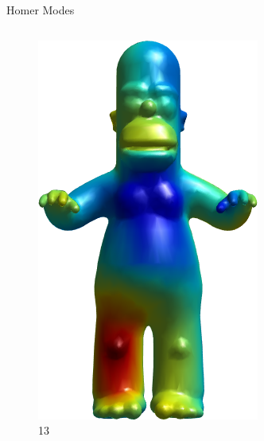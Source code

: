 \documentclass{beamer}
\begin{document}
\begin{frame}{Homer Modes}
\begin{columns}
\begin{column}[T]{3cm}
\begin{figure}[t]
    \includegraphics[width=\textwidth]{Harmonics/HomerModes/13.png}
    \caption*{\huge 13}
\end{figure}
\end{column}
\begin{column}[T]{3cm}
\begin{figure}[t]


\end{figure}
\end{column}
\end{columns}
\end{frame}
\end{document}
